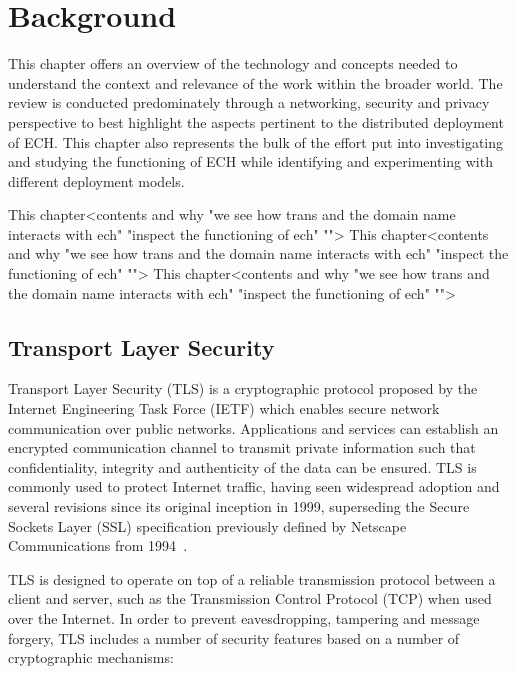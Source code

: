 \chapter{Background}\label{Background}

This chapter offers an overview of the technology and concepts needed to understand the context and relevance of the work within the broader world. The review is conducted predominately through a networking, security and privacy perspective to best highlight the aspects pertinent to the distributed deployment of ECH. This chapter also represents the bulk of the effort put into investigating and studying the functioning of ECH while identifying and experimenting with different deployment models.

This chapter<contents and why "we see how trans and the domain name interacts with ech" "inspect the functioning of ech" "">
This chapter<contents and why "we see how trans and the domain name interacts with ech" "inspect the functioning of ech" "">
This chapter<contents and why "we see how trans and the domain name interacts with ech" "inspect the functioning of ech" "">








\section{Transport Layer Security}

Transport Layer Security (TLS) is a cryptographic protocol proposed by the Internet Engineering Task Force (IETF) which enables secure network communication over public networks. Applications and services can establish an encrypted communication channel to transmit private information such that confidentiality, integrity and authenticity of the data can be ensured. TLS is commonly used to protect Internet traffic, having seen widespread adoption and several revisions since its original inception in 1999, superseding the Secure Sockets Layer (SSL) specification previously defined by Netscape Communications from 1994~\cite{chan2018monitoring, LE-HTTPS, rfc2246}.

TLS is designed to operate on top of a reliable transmission protocol between a client and server, such as the Transmission Control Protocol (TCP) when used over the Internet. In order to prevent eavesdropping, tampering and message forgery, TLS includes a number of security features based on a number of cryptographic mechanisms:

